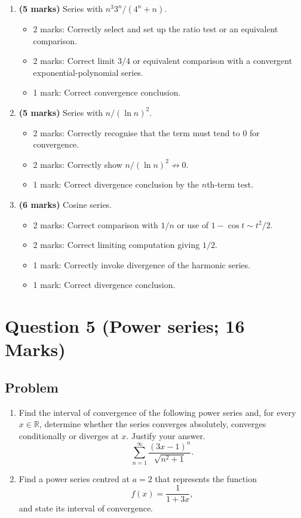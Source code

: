 \documentclass[12pt]{article}
\newcommand{\R}{\mathbb{R}}
\begin{document}
\begin{enumerate}[label=(\alph*)]
\item \textbf{(5 marks)} Series with $n^3 3^n/(4^n+n)$.
\begin{itemize}
\item 2 marks: Correctly select and set up the ratio test or an equivalent comparison.
\item 2 marks: Correct limit $3/4$ or equivalent comparison with a convergent exponential-polynomial series.
\item 1 mark: Correct convergence conclusion.
\end{itemize}

\item \textbf{(5 marks)} Series with $n/(\ln n)^2$.
\begin{itemize}
\item 2 marks: Correctly recognise that the term must tend to $0$ for convergence.
\item 2 marks: Correctly show $n/(\ln n)^2\not\to 0$.
\item 1 mark: Correct divergence conclusion by the $n$th-term test.
\end{itemize}

\item \textbf{(6 marks)} Cosine series.
\begin{itemize}
\item 2 marks: Correct comparison with $1/n$ or use of $1-\cos t\sim t^2/2$.
\item 2 marks: Correct limiting computation giving $1/2$.
\item 1 mark: Correctly invoke divergence of the harmonic series.
\item 1 mark: Correct divergence conclusion.
\end{itemize}
\end{enumerate}

\newpage
\section{Question 5 (Power series; 16 Marks)}

\subsection{Problem}

\begin{enumerate}[label=(\alph*)]
\item Find the interval of convergence of the following power series and, for every $x\in\R$, determine whether the series converges absolutely, converges conditionally or diverges at $x$. Justify your answer.
\[
\sum_{n=1}^{\infty}\frac{(3x-1)^n}{\sqrt{n^2+1}}.
\]

\item Find a power series centred at $a=2$ that represents the function
\[
f(x)=\frac{1}{1+3x},
\]
and state its interval of convergence.
\end{enumerate}
\end{document}
